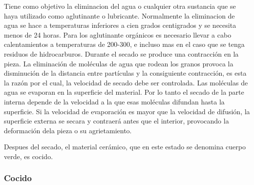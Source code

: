 \documentclass[a4paper, 11pt]{article}
\begin{document}
Tiene como objetivo la eliminacion del agua o cualquier otra sustancia que se haya utilizado como aglutinante o lubricante. Normalmente la eliminacion de agua se hace a temperaturas inferiores a cien grados centigrados y se necesita menos de 24 horas. Para los aglutinante orgánicos es necesario llevar a cabo calentamientos a temperaturas de 200-300, e incluso mas en el caso que se tenga residuos de hidrocarburos. Durante el secado se produce una contracción en la pieza. La eliminación de moléculas de agua que rodean los granos provoca la disminución de la distancia entre partículas y la consiguiente contracción, es esta la razón por el cual, la velocidad de secado debe ser controlada. Las moléculas de agua se evaporan en la superficie del material. Por lo tanto el secado de la parte interna depende de la velocidad a la que esas moléculas difundan hasta la superficie. Si la velocidad de evaporación es mayor que la velocidad de difusión, la superficie externa se secara y contraerá antes que el interior, provocando la deformación dela pieza o su agrietamiento.

Despues del secado, el material cerámico, que en este estado se denomina cuerpo verde, es cocido.

\subsubsection{Cocido}
\end{document}
